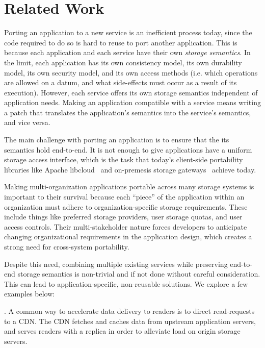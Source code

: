 \chapter{Related Work}
\label{chap:related-work}

Porting an application to a new service is an inefficient process today,
since the code required to do so is hard to reuse to port another application.
This is because each application and each service have their own \emph{storage
semantics}.  In the limit, each application has its own consistency
model, its own durability model, its own security model, and its own access
methods (i.e. which operations are allowed on a datum, and what side-effects
must occur as a result of its execution).  However, each service
offers its own storage semantics independent of application needs.  Making an application
compatible with a service means writing a patch that translates the
application's semantics into the service's semantics, and vice versa.

The main challenge with porting an application is to ensure that the
its semantics hold end-to-end.  It is not enough to give applications
have a uniform storage access interface, which is the task that today's client-side
portability libraries like Apache libcloud~\cite{libcloud} and on-premesis
storage gateways~\cite{} achieve today.

Making multi-organization applications portable across many storage systems is
important to their survival because each ``piece'' of the application within an
organization must adhere to organization-specific storage requirements.  These
include things like preferred storage providers, user storage quotas, and user access controls.
Their multi-stakeholder nature forces developers to anticipate changing organizational requirements
in the application design, which creates a strong need for cross-system
portability.

Despite this need, combining multiple existing services while preserving end-to-end
storage semantics is non-trivial and if not done without careful consideration.
This can lead to application-specific, non-reusable solutions.  We explore a few examples below:

.  A common way to accelerate
data delivery to readers is to direct read-requests to a CDN.  The CDN
fetches and caches data from upstream application servers, and serves readers
with a replica in order to alleviate load on origin storage servers.

